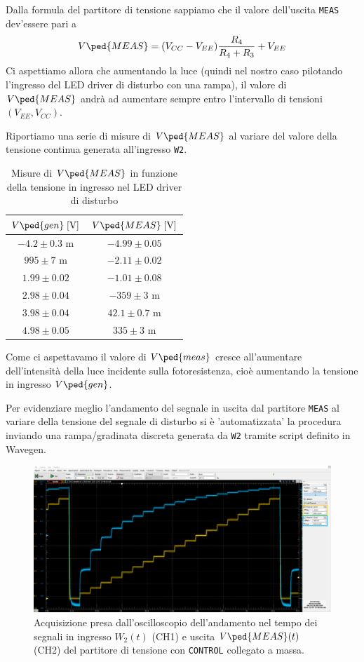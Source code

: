 \documentclass[10pt, a4paper, italian]{article}
\begin{document}
Dalla formula del partitore di tensione sappiamo che il valore dell'uscita
\verb+MEAS+ dev'essere pari a
\begin{equation}
V\ped{MEAS} = (V_{CC} -  V_{EE})\frac{R_4}{R_4 + R_3} + V_{EE}
\end{equation}
Ci aspettiamo allora che aumentando la luce (quindi nel nostro caso pilotando
l'ingresso del LED driver di disturbo con una rampa), il valore di
$V\ped{MEAS}$ andrà ad aumentare sempre entro l'intervallo di tensioni
$(V_{EE}, V_{CC})$.

Riportiamo una serie di misure di $V\ped{MEAS}$ al variare del valore della
tensione continua generata all'ingresso \verb+W2+.
\begin{table}[htbp]
\centering
\begin{tabular}{@{}cc@{}}
\toprule
$V\ped{gen} \; [\si{\V}]$ & $V\ped{MEAS} \; [\si{\V}]$\\
\midrule
\midrule
$-4.2 \pm 0.3$ m 	& $ -4.99 \pm 0.05$	\\
$995 \pm 7$ m 	& $ -2.11 \pm 0.02 $	\\
$1.99 \pm 0.02$ 	& $ -1.01 \pm 0.08 $\\
$2.98 \pm 0.04$ 	& $ -359 \pm 3 $ m\\
$3.98 \pm 0.04$ 	& $ 42.1 \pm 0.7 $ m\\
$4.98 \pm 0.05$ 	& $ 335 \pm 3$ m\\
\bottomrule
\end{tabular}
\caption{Misure di $V\ped{MEAS}$ in funzione della tensione in ingresso nel
LED driver di disturbo}
\end{table}
Come ci aspettavamo il valore di $V\ped{meas}$ cresce all'aumentare
dell'intensità della luce incidente sulla fotoresistenza, cioè aumentando la
tensione in ingresso $V\ped{gen}$.

Per evidenziare meglio l'andamento del segnale in uscita dal partitore
\verb+MEAS+ al variare della tensione del segnale di disturbo si è
'automatizzata' la procedura inviando una rampa/gradinata discreta generata
da \verb+W2+ tramite script definito in Wavegen.
\begin{figure}[htbp]
    \centering
	\includegraphics[width=\textwidth]{measgrad}
    \caption{Acquisizione presa dall'oscilloscopio dell'andamento nel tempo dei
	segnali in ingresso $W_2 (t)$ (CH1) e uscita $V\ped{MEAS} (t)$ (CH2)
	del partitore di tensione con \texttt{CONTROL} collegato a massa.
    \label{fig: measgrad}}
\end{figure}
\end{document}
